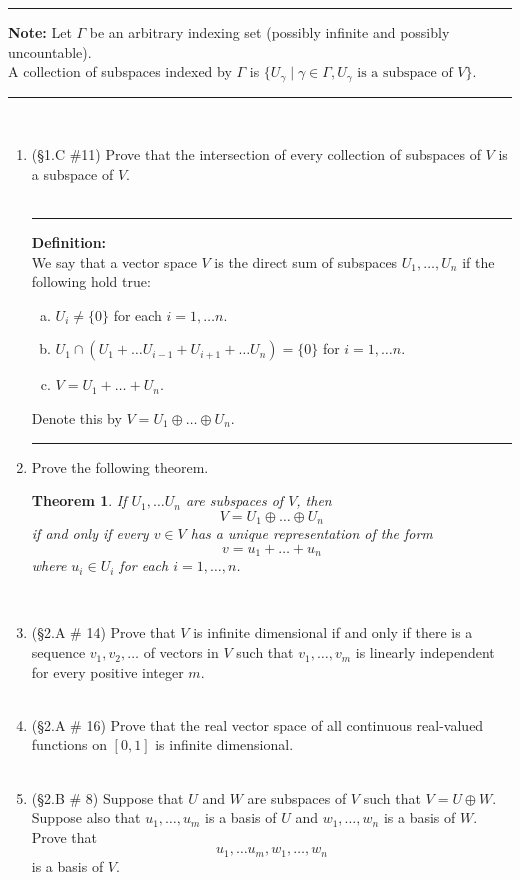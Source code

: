 \documentclass[12pt,letterpaper]{article}
\theoremstyle{plain}
\newtheorem{theorem}{Theorem}[section]
\theoremstyle{definition}
\begin{document}
\hrule
\vspace{.1in}
 {\bf Note:} Let $\Gamma$ be an arbitrary indexing set (possibly infinite and possibly uncountable).\\ \indent A collection of subspaces indexed by $\Gamma$ is $\{U_\gamma \mid \gamma\in \Gamma, U_\gamma\text{ is a subspace of } V\}$.\\
\hrule
\ \\
\begin{enumerate}[1.]
\item (\S 1.C \#11) Prove that the intersection of every collection of subspaces of $V$ is a subspace of $V$. \\
\ \\
\hrule 
{\bf Definition:}\vspace{.1in}\\
We say that a vector space $V$ is the direct sum of subspaces $U_1, \ldots ,U_n$ if the following hold true:
\begin{enumerate}[(a)]
\item $U_i\neq \{0\}$ for each $i=1, \ldots n$. 
\item $U_1\cap (U_1+\ldots U_{i-1}+U_{i+1}+\ldots U_n)=\{0\}$ for $i=1,\ldots n$. 
\item $V=U_1+\ldots +U_n$. 
\end{enumerate}
Denote this by $V=U_1\oplus\ldots \oplus U_n$. \\

\hrule
\item Prove the following theorem. \\
\begin{theorem} If $U_1, \ldots U_n$ are subspaces of $V$, then 
\[V=U_1\oplus \ldots \oplus U_n\] if and only if every $v\in V$ has a unique representation of the form 
\[v=u_1+\ldots +u_n\] 
where $u_i\in U_i$ for each $i=1,\ldots, n$. 
\end{theorem}
\ \\
\item (\S 2.A \# 14) Prove that $V$ is infinite dimensional if and only if there is a sequence $v_1, v_2, \ldots $ of vectors in $V$ such that $v_1, \ldots ,v_m$ is linearly independent for every positive integer $m$. \\
\ \\
\item (\S 2.A \# 16) Prove that the real vector space of all continuous real-valued functions on $[0,1]$ is infinite dimensional. \\
\ \\
\item (\S 2.B \# 8) Suppose that $U$ and $W$ are subspaces of $V$ such that $V=U\oplus W$. Suppose also that $u_1, \ldots ,u_m$ is a basis of $U$ and $w_1, \ldots , w_n$ is a basis of $W$. Prove that 
\[u_1, \ldots u_m, w_1, \ldots, w_n\]
is a basis of $V$. 
\end{enumerate}
\end{document}
